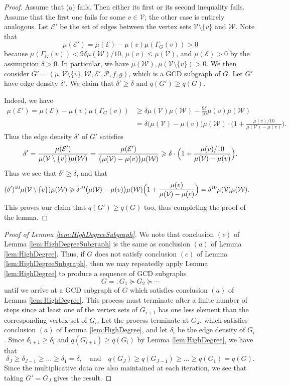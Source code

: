 \documentclass[12pt]{amsart}
\numberwithin{equation}{section}
\theoremstyle{definition}
\theoremstyle{remark}
\newcommand{\CE}{\mathcal{E}}
\newcommand{\CP}{\mathcal{P}}
\newcommand{\CV}{\mathcal{V}}
\newcommand{\CW}{\mathcal{W}}
\newcommand{\als}[1]{\begin{align*} #1 \end{align*} }
\renewcommand{\le}{\leqslant}
\renewcommand{\ge}{\geqslant}
\begin{document}
\begin{proof} Assume that (a) fails. Then either its first or its second inequality fails. Assume that the first one fails for some $v\in\CV$; the other case is entirely analogous. Let $\CE'$ be the set of edges between the vertex sets $\CV\setminus\{v\}$ and $\CW$. Note that 
\[
\mu(\CE')= \mu(\CE)-\mu(v)\mu(\Gamma_G(v)) >0
\]
because $\mu(\Gamma_G(v))<9\delta\mu(\CW)/10$, $\mu(v)\le \mu(\CV)$, and $\mu(\CE)>0$ by the assumption $\delta>0$. In particular, we have $\mu(\CW),\mu(\CV\setminus\{v\})>0$. We then consider $G'=(\mu,\CV\setminus\{v\},\CW,\CE',\CP,f,g)$, which is a GCD subgraph of $G$. Let $G'$ have edge density $\delta'$. We claim that $\delta'\ge \delta$ and $q(G')\ge q(G)$.

Indeed, we have
\als{
\mu(\CE')
	= \mu(\CE)-\mu(v)\mu(\Gamma_G(v)) 
	&\ge \delta \mu(\CV)\mu(\CW)-\frac{9\delta}{10}\mu(v)\mu(\CW) \\
	&=\delta \big(\mu(\CV)-\mu(v)\big)\mu(\CW)\cdot\Big(1+\frac{\mu(v)/10}{\mu(\CV)-\mu(v)}\Big).
}
Thus the edge density $\delta'$ of $G'$ satisfies
\[
\delta'=\frac{\mu(\CE')}{\mu(\CV\setminus\{v\})\mu(\CW)}
		=\frac{\mu(\CE')}{\big(\mu(\CV)-\mu(v)\big)\mu(\CW)}
		\ge \delta\cdot \Bigl(1+\frac{\mu(v)/10}{\mu(\CV)-\mu(v)}\Bigr).
\]
Thus we see that $\delta'\ge \delta$, and that 
\begin{align*}
(\delta')^{10}\mu(\CV\setminus\{v\})\mu(\CW)
	&\ge \delta^{10}\big(\mu(\CV)-\mu(v)\big)\mu(\CW)
		\Bigl(1+\frac{\mu(v)}{\mu(\CV)-\mu(v)}\Bigr)
		= \delta^{10} \mu(\CV)\mu(\CW) .
\end{align*}
This proves our claim that $q(G')\ge q(G)$ too, thus completing the proof of the lemma.
\end{proof}
\begin{proof}[Proof of Lemma \ref{lem:HighDegreeSubgraph}]
We note that conclusion $(c)$ of Lemma \ref{lem:HighDegreeSubgraph} is the same as conclusion $(a)$ of Lemma \ref{lem:HighDegree}. Thus, if $G$ does not satisfy conclusion $(c)$ of Lemma \ref{lem:HighDegreeSubgraph}, then we may repeatedly apply Lemma \ref{lem:HighDegree} to produce a sequence of GCD subgraphs 
\[
G=:G_1\succeq G_2\succeq\cdots 
\]
until we arrive at a GCD subgraph of $G$ which satisfies conclusion $(a)$ of Lemma \ref{lem:HighDegree}. This process must terminate after a finite number of steps since at least one of the vertex sets of $G_{i+1}$ has one less element than the corresponding vertex set of $G_i$. Let the process terminate at $G_J$, which satisfies conclusion $(a)$ of Lemma \ref{lem:HighDegree}, and let $\delta_i$ be the edge density of $G_i$. Since $\delta_{i+1}\ge \delta_i$ and $q(G_{i+1})\ge q(G_i)$ by Lemma \ref{lem:HighDegree}, we have that 
\[
\delta_J\ge \delta_{J-1}\ge \dots \ge \delta_1=\delta,\quad \text{and}\quad q(G_J)\ge q(G_{J-1})\ge \dots\ge q(G_1)=q(G).
\]
Since the multiplicative data are also maintained at each iteration, we see that taking $G'=G_J$ gives the result.
\end{proof}
\end{document}
